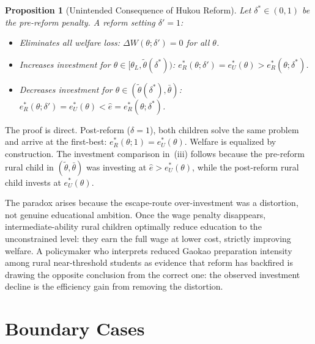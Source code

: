 \documentclass[12pt]{article}
\theoremstyle{plain}
\newtheorem{proposition}{Proposition}
\theoremstyle{definition}
\theoremstyle{remark}
\begin{document}
\begin{proposition}[Unintended Consequence of Hukou Reform]
\label{prop:reform}
Let $\delta^{*}\in(0,1)$ be the pre-reform penalty.  A reform setting $\delta'=1$:
\begin{itemize}
  \item[\textit{(i)}] Eliminates all welfare loss: $\Delta W(\theta;\delta')=0$
    for all $\theta$.
  \item[\textit{(ii)}] Increases investment for
    $\theta\in[\theta_{L},\tilde{\theta}(\delta^{*}))$:
    $e^{*}_{R}(\theta;\delta')=e^{*}_{U}(\theta)>e^{*}_{R}(\theta;\delta^{*})$.
  \item[\textit{(iii)}] \textit{Decreases} investment for
    $\theta\in(\tilde{\theta}(\delta^{*}),\bar{\theta})$:
    $e^{*}_{R}(\theta;\delta')=e^{*}_{U}(\theta)<\hat{e}=
    e^{*}_{R}(\theta;\delta^{*})$.
\end{itemize}
\end{proposition}

The proof is direct.  Post-reform ($\delta=1$), both children solve the same
problem and arrive at the first-best: $e^{*}_{R}(\theta;1)=e^{*}_{U}(\theta)$.
Welfare is equalized by construction.  The investment comparison in~(iii) follows
because the pre-reform rural child in $(\tilde{\theta},\bar{\theta})$ was
investing at $\hat{e}>e^{*}_{U}(\theta)$, while the post-reform rural child
invests at $e^{*}_{U}(\theta)$.

The paradox arises because the escape-route over-investment was a distortion, not
genuine educational ambition.  Once the wage penalty disappears, intermediate-ability
rural children optimally reduce education to the unconstrained level: they earn the
full wage at lower cost, strictly improving welfare.  A policymaker who interprets
reduced Gaokao preparation intensity among rural near-threshold students as evidence
that reform has backfired is drawing the opposite conclusion from the correct one:
the observed investment decline is the efficiency gain from removing the distortion.

\section{Boundary Cases}
\end{document}
